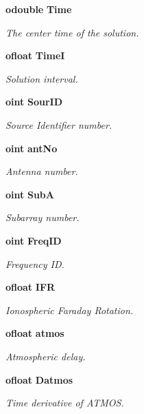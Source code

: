 \begin{CompactItemize}
{\bf odouble} {\bf Time}
\begin{CompactList}\small\item\em The center time of the solution. \item\end{CompactList}\item 
{\bf ofloat} {\bf Time\-I}
\begin{CompactList}\small\item\em Solution interval. \item\end{CompactList}\item 
{\bf oint} {\bf Sour\-ID}
\begin{CompactList}\small\item\em Source Identifier number. \item\end{CompactList}\item 
{\bf oint} {\bf ant\-No}
\begin{CompactList}\small\item\em Antenna number. \item\end{CompactList}\item 
{\bf oint} {\bf Sub\-A}
\begin{CompactList}\small\item\em Subarray number. \item\end{CompactList}\item 
{\bf oint} {\bf Freq\-ID}
\begin{CompactList}\small\item\em Frequency ID. \item\end{CompactList}\item 
{\bf ofloat} {\bf IFR}
\begin{CompactList}\small\item\em Ionospheric Faraday Rotation. \item\end{CompactList}\item 
{\bf ofloat} {\bf atmos}
\begin{CompactList}\small\item\em Atmospheric delay. \item\end{CompactList}\item 
{\bf ofloat} {\bf Datmos}
\begin{CompactList}\small\item\em Time derivative of ATMOS. \item\end{CompactList}\item 

\end{CompactItemize}
